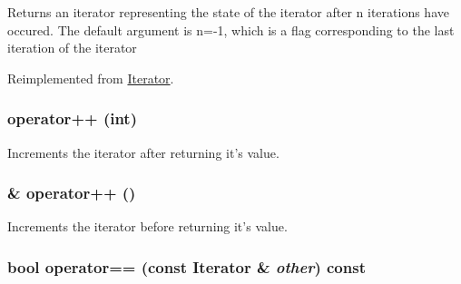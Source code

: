 Returns an iterator representing the state of the iterator after n iterations have occured. The default argument is n=-\/1, which is a flag corresponding to the last iteration of the iterator 

Reimplemented from \hyperlink{classJKBuilder_1_1Iterator_a5f692b73d2e160450f4617bb75825e11}{Iterator}.\hypertarget{classJKBuilder_1_1Iterator_ac1702aedba13b4112b891b58dfd78eba}{
\subsubsection[{operator++}]{ operator++ (int)}}
\label{classJKBuilder_1_1Iterator_ac1702aedba13b4112b891b58dfd78eba}


Increments the iterator after returning it's value. \hypertarget{classJKBuilder_1_1Iterator_ae1f21c74128a5ef5d1b9de72ceb09be8}{
\subsubsection[{operator++}]{ \& operator++ ()}}
\label{classJKBuilder_1_1Iterator_ae1f21c74128a5ef5d1b9de72ceb09be8}


Increments the iterator before returning it's value. \hypertarget{classJKBuilder_1_1Iterator_a1ea001976a5bc8ae8dc365e2a912b59a}{
\subsubsection[{operator==}]{\setlength{\rightskip}{0pt plus 5cm}bool operator== (const {\bf Iterator} \& {\em other}) const}}
\label{classJKBuilder_1_1Iterator_a1ea001976a5bc8ae8dc365e2a912b59a}


